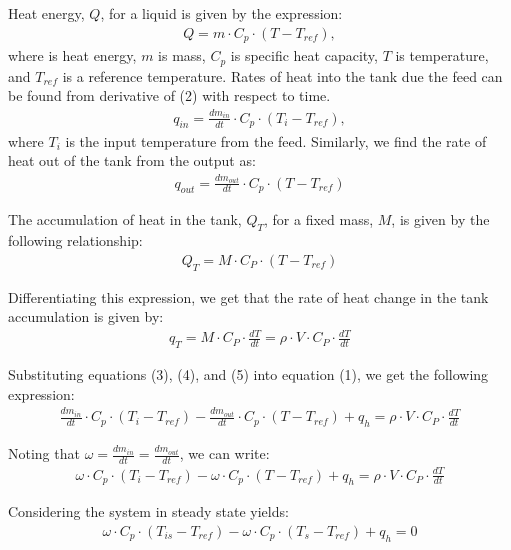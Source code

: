 \documentclass{article}
\begin{document}
Heat energy, $Q$, for a liquid is given by the expression:
\begin{align}
Q = m \cdot C_p \cdot (T - T_{ref}),
\end{align}
where is heat energy, $m$ is mass, $C_p$ is specific heat capacity, $T$ is temperature, and $T_{ref}$ is a reference temperature. Rates of heat into the tank due the feed can be found from derivative of (2) with respect to time.
\begin{align}
q_{in} = \frac{dm_{in}}{dt} \cdot C_p \cdot (T_i - T_{ref}),
\end{align}
where $T_i$ is the input temperature from the feed. Similarly, we find the rate of heat out of the tank from the output as:
\begin{align}
q_{out} = \frac{dm_{out}}{dt} \cdot C_p \cdot (T - T_{ref})
\end{align}

The accumulation of heat in the tank, $Q_T$, for a fixed mass, $M$, is given by the following relationship:
\begin{align*}
Q_{T} = M \cdot C_P \cdot (T - T_{ref})
\end{align*}

Differentiating this expression, we get that the rate of heat change in the tank accumulation is given by:
\begin{align}
q_{T} = M \cdot C_P \cdot \frac{dT}{dt} = \rho \cdot V \cdot C_P \cdot \frac{dT}{dt}
\end{align}

Substituting equations (3), (4), and (5) into equation (1), we get the following expression:
\begin{align*}
\frac{dm_{in}}{dt} \cdot C_p \cdot (T_i - T_{ref}) - \frac{dm_{out}}{dt} \cdot C_p \cdot (T - T_{ref}) + q_h = \rho \cdot V \cdot C_P \cdot \frac{dT}{dt}
\end{align*}

Noting that $\omega = \frac{dm_{in}}{dt} = \frac{dm_{out}}{dt}$, we can write:
\begin{align}
\omega \cdot C_p \cdot (T_i - T_{ref}) - \omega \cdot C_p \cdot (T - T_{ref}) + q_h = \rho \cdot V \cdot C_P \cdot \frac{dT}{dt}
\end{align}

Considering the system in steady state yields:
\begin{align}
\omega \cdot C_p \cdot (T_{is} - T_{ref}) - \omega \cdot C_p \cdot (T_s - T_{ref}) + q_h = 0
\end{align}
\end{document}
